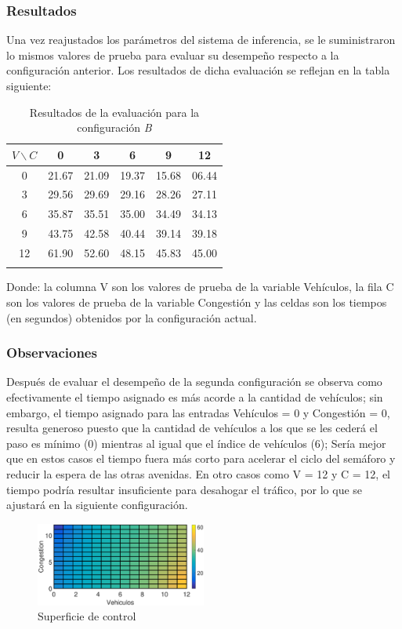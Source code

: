 \pagebreak
\subsubsection{Resultados}
Una vez reajustados los parámetros del sistema de inferencia, se le suministraron lo mismos valores de prueba para evaluar su desempeño respecto a la configuración anterior. Los resultados de dicha evaluación se reflejan en la tabla siguiente:

\begin{longtable}[c]{cccccc} \toprule
	$V \backslash C$ &  0 & 3 & 6 & 9 & 12 \\ \midrule
	0 & 21.67 & 21.09 & 19.37 & 15.68 & 06.44 \\
	3 & 29.56 & 29.69 & 29.16 & 28.26 & 27.11 \\
	6 & 35.87 & 35.51 & 35.00 & 34.49 & 34.13 \\
	9 & 43.75 & 42.58 & 40.44 & 39.14 & 39.18 \\
	12& 61.90 & 52.60 & 48.15 & 45.83 & 45.00 \\
	\caption{Resultados de la evaluación para la configuración \textit{B}}
\end{longtable}

Donde: la columna V son los valores de prueba de la variable Vehículos, la fila C son los valores de  prueba de la variable Congestión y las celdas son los tiempos (en segundos) obtenidos por la configuración actual.

\subsubsection{Observaciones}
\begin{multicols}{2}
Después de evaluar el desempeño de la segunda configuración se observa como efectivamente el tiempo asignado es más acorde a la cantidad de vehículos; sin embargo, el tiempo asignado para las entradas Vehículos = 0 y Congestión = 0, resulta generoso puesto que la cantidad de vehículos a los que se les cederá el paso es mínimo (0) mientras al igual que el índice de vehículos (6); Sería mejor que en estos casos el tiempo fuera más corto para acelerar el ciclo del semáforo y reducir la espera de las otras avenidas. En otro casos como V = 12 y C = 12, el tiempo podría resultar insuficiente para desahogar el tráfico, por lo que se ajustará en la siguiente configuración.

\begin{figure}[H]
	\includegraphics[width=0.5\textwidth]{Surfaces/Surface2D_B.eps}
	\caption{Superficie de control}
\end{figure}

\end{multicols}


